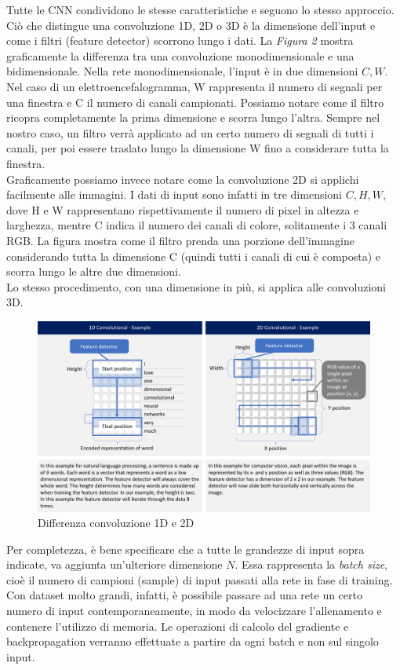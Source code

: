 \documentclass{article}
\begin{document}
Tutte le CNN condividono le stesse caratteristiche e seguono lo stesso approccio. Ciò che distingue una convoluzione 1D, 2D o 3D è la dimensione dell'input e come i filtri (feature detector) scorrono lungo i dati. La \textit{Figura 2} mostra graficamente la differenza tra una convoluzione monodimensionale e una bidimensionale. Nella rete monodimensionale, l'input è in due dimensioni $C, W$. Nel caso di un elettroencefalogramma, W rappresenta il numero di segnali per una finestra e C il numero di canali campionati. Possiamo notare come il filtro ricopra completamente la prima dimensione e scorra lungo l'altra. Sempre nel nostro caso, un filtro verrà applicato ad un certo numero di segnali di tutti i canali, per poi essere traslato lungo la dimensione W fino a considerare tutta la finestra.\\
Graficamente possiamo invece notare come la convoluzione 2D si applichi facilmente alle immagini. I dati di input sono infatti in tre dimensioni $C, H, W$, dove H e W rappresentano rispettivamente il numero di pixel in altezza e larghezza, mentre C indica il numero dei canali di colore, solitamente i 3 canali RGB. La figura mostra come il filtro prenda una porzione dell'immagine considerando tutta la dimensione C (quindi tutti i canali di cui è composta) e scorra lungo le altre due dimensioni. \\
Lo stesso procedimento, con una dimensione in più, si applica alle convoluzioni 3D. 
\begin{figure}[!h]
\centering
\includegraphics[scale=0.2]{conv1d}
\caption{Differenza convoluzione 1D e 2D}
\end{figure}

Per completezza, è bene specificare che a tutte le grandezze di input sopra indicate, va aggiunta un'ulteriore dimensione $N$. Essa rappresenta la \textit{batch size}, cioè il numero di campioni (sample) di input passati alla rete in fase di training. Con dataset molto grandi, infatti, è possibile passare ad una rete un certo numero di input contemporaneamente, in modo da velocizzare l'allenamento e contenere l'utilizzo di memoria. Le operazioni di calcolo del gradiente e backpropagation verranno effettuate a partire da ogni batch e non sul singolo input. 
\end{document}
